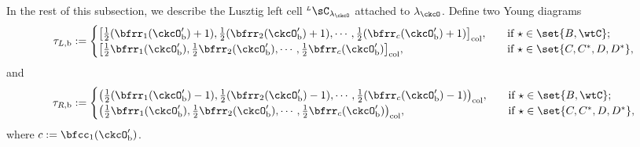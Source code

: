 \documentclass[12pt]{amsart}
\numberwithin{equation}{section}
\theoremstyle{remark}
\def\half{{\tfrac{1}{2}}}
\def\LC{{}^{\scriptscriptstyle L}\sC}
\begin{document}
  In the rest of this subsection, we describe the Lusztig left cell $\LC_{\lambda_{\ckcO}}$
  attached to $\lambda_{\ckcO}$.
 Define two Young diagrams
 \begin{equation}\label{eq:taub}
    \begin{split}
      \tau_{L,\mathrm b} := \begin{cases}
        \big[\half(\bfrr_{1}(\ckcO'_{\mathrm b})+1), \half(\bfrr_{2}(\ckcO'_{\mathrm b})+1), \cdots, \half(\bfrr_{c}(\ckcO'_{\mathrm b})+1)\big]_{\mathrm{col}},
               &\quad \text{if } \star \in \set{B,\wtC}; \\%
         \big[\half\bfrr_{1}(\ckcO'_{\mathrm b}), \half\bfrr_{2}(\ckcO'_{\mathrm b}),\cdots, \half\bfrr_{c}(\ckcO'_{\mathrm b})\big]_{\mathrm{col}},
        &\quad  \text{if } \star \in \set{C,C^{*}, D,D^{*}},\\
      \end{cases}
    \end{split}
  \end{equation}
  and
   \begin{equation}\label{eq:taub2}
    \begin{split}
      \tau_{R,\mathrm b} := \begin{cases}
        \big(\half(\bfrr_{1}(\ckcO'_{\mathrm b})-1), \half(\bfrr_{2}(\ckcO'_{\mathrm b})-1), \cdots, \half(\bfrr_{c}(\ckcO'_{\mathrm b})-1)\big)_{\mathrm{col}},
               &\quad \text{if } \star \in \set{B,\wtC}; \\%
         \big(\half\bfrr_{1}(\ckcO'_{\mathrm b}), \half\bfrr_{2}(\ckcO'_{\mathrm b}),\cdots, \half\bfrr_{c}(\ckcO'_{\mathrm b})\big)_{\mathrm{col}},
        &\quad  \text{if } \star \in \set{C,C^{*}, D,D^{*}},\\
      \end{cases}
    \end{split}
  \end{equation}
 where $c:= \bfcc_{1}(\ckcO'_{\mathrm b})$.
\end{document}
